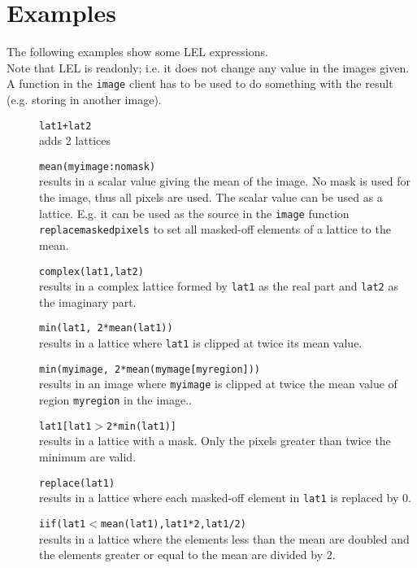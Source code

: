 \section{\label{LEL:EXAMPLES}{Examples}}
The following examples show some LEL expressions.
\\Note that LEL is readonly; i.e. it does not change any value in
the images given. A function in the \texttt{image} client has to
be used to do something with the result (e.g. storing in another image).
\begin{description}
  \item[] \texttt{lat1+lat2}
    \\adds 2 lattices
  \item[] \texttt{mean(myimage:nomask)}
    \\results in a scalar value giving the mean of the image.
    No mask is used for the image, thus all pixels are used.
    The scalar value can be used as a lattice. E.g. it can be used as
    the source in the \texttt{image} function
    \texttt{replacemaskedpixels} to set all masked-off elements of a
    lattice to the mean.
  \item[] \texttt{complex(lat1,lat2)}
    \\results in a complex lattice formed by \texttt{lat1} as the
    real part and \texttt{lat2} as the imaginary part.
  \item[] \texttt{min(lat1, 2*mean(lat1))}
    \\results in a lattice where \texttt{lat1} is clipped at twice
    its mean value.
  \item[] \texttt{min(myimage, 2*mean(mymage[myregion]))}
    \\results in an image where \texttt{myimage} is clipped at twice
    the mean value of region \texttt{myregion} in the image..
  \item[] \texttt{lat1[lat1$>$2*min(lat1)]}
    \\results in a lattice with a mask. Only the pixels
    greater than twice the minimum are valid.
  \item[] \texttt{replace(lat1)}
    \\results in a lattice where each masked-off element in
    \texttt{lat1} is replaced by 0.
  \item[] \texttt{iif(lat1$<$mean(lat1),lat1*2,lat1/2)}
    \\results in a lattice where the elements less than the mean
    are doubled and the elements greater or equal to the mean are
    divided by 2.
\end{description}

